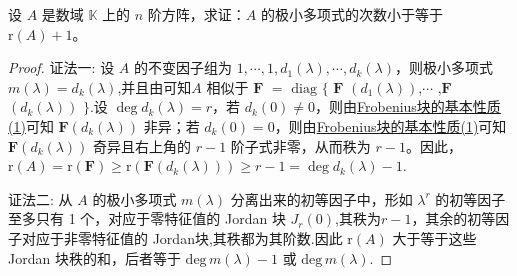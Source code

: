 \documentclass[../../main.tex]{subfiles}%
\begin{document}
\begin{proposition}\label{proposition:极小多项式的次数小于等于矩阵的秩加1}
设 $A$ 是数域 $\mathbb{K}$ 上的 $n$ 阶方阵，求证：$A$ 的极小多项式的次数小于等于 $\mathrm{r}(A)+1$。
\end{proposition}
\begin{proof}

{\color{blue}证法一:}
设 $A$ 的不变因子组为 $1,\cdots,1,d_1(\lambda),\cdots,d_k(\lambda)$，则极小多项式 $m(\lambda)=d_k(\lambda)$,并且由可知$A$ 相似于 $\boldsymbol{F}$ $=$ $\mathrm{diag}$ $\{$ $\boldsymbol{F}$ $(d_1(\lambda))$,$\cdots$ ,$\boldsymbol{F}$ $(d_k(\lambda))$ $\}$.设 $\deg d_k(\lambda)=r$，若 $d_k(0)\neq 0$，则由\hyperref[lemma:Frobenius标准型矩阵的极小多项式和不变因子]{Frobenius块的基本性质(1)}可知 $\boldsymbol{F}(d_k(\lambda))$ 非异；若 $d_k(0)=0$，则由\hyperref[lemma:Frobenius标准型矩阵的极小多项式和不变因子]{Frobenius块的基本性质(1)}可知 $\boldsymbol{F}(d_k(\lambda))$ 奇异且右上角的 $r - 1$ 阶子式非零，从而秩为 $r - 1$。因此，$\mathrm{r}(A)=\mathrm{r}(\boldsymbol{F})\geqslant \mathrm{r}(\boldsymbol{F}(d_k(\lambda)))\geqslant  r - 1=\deg d_k(\lambda)-1$.

{\color{blue}证法二:}
从 $A$ 的极小多项式 $m(\lambda)$ 分离出来的初等因子中，形如 $\lambda^r$ 的初等因子至多只有 1 个，对应于零特征值的 Jordan 块 $J_r(0)$,其秩为$r-1$，其余的初等因子对应于非零特征值的 Jordan块,其秩都为其阶数.因此 $\mathrm{r}(A)$ 大于等于这些 Jordan 块秩的和，后者等于 $\mathrm{deg}\,m(\lambda) - 1$ 或 $\mathrm{deg}\,m(\lambda)$.

\end{proof}
\end{document}
